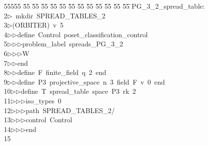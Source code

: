 %
%
\begin{tabbing}
55555 \= 55 \= 55 \= 55 \= 55 \= 55 \= 55 \= 55 \= 55 \= 55 \= 55 \= 55 \= 55 \= \>PG\_3\_2\_spread\_table:\\[0pt]
2\>$\triangleright$\>\ mkdir\ SPREAD\_TABLES\_2\\[0pt]
3\>$\triangleright$\>(ORBITER)\ v\ 5\ \\[0pt]
4\>$\triangleright$\>$\triangleright$\>define\ Control\ poset\_classification\_control\ \\[0pt]
5\>$\triangleright$\>$\triangleright$\>$\triangleright$\>problem\_label\ spreads\_PG\_3\_2\ \\[0pt]
6\>$\triangleright$\>$\triangleright$\>$\triangleright$\>W\ \\[0pt]
7\>$\triangleright$\>$\triangleright$\>end\ \\[0pt]
8\>$\triangleright$\>$\triangleright$\>define\ F\ finite\_field\ q\ 2\ end\ \\[0pt]
9\>$\triangleright$\>$\triangleright$\>define\ P3\ projective\_space\ n\ 3\ field\ F\ v\ 0\ end\ \\[0pt]
10\>$\triangleright$\>$\triangleright$\>define\ T\ spread\_table\ space\ P3\ rk\ 2\ \\[0pt]
11\>$\triangleright$\>$\triangleright$\>$\triangleright$\>iso\_types\ 0\ \\[0pt]
12\>$\triangleright$\>$\triangleright$\>$\triangleright$\>path\ SPREAD\_TABLES\_2/\ \\[0pt]
13\>$\triangleright$\>$\triangleright$\>$\triangleright$\>control\ Control\ \\[0pt]
14\>$\triangleright$\>$\triangleright$\>$\triangleright$\>end\ \\[0pt]
15\>\end{tabbing}
